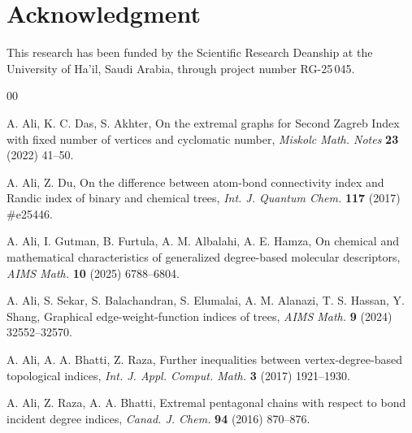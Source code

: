 \documentclass[12pt,a4paper]{article}
\begin{document}
\section*{Acknowledgment}

This research has been funded by the Scientific Research Deanship at the University of Ha\!'il, Saudi Arabia, through project number RG-25\,045.

\footnotesize

 \begin{thebibliography}{00}

 A. Ali, K. C. Das, S. Akhter, On the extremal graphs for Second Zagreb Index with fixed number of vertices and cyclomatic number, {\it Miskolc Math. Notes} {\bf23} (2022) 41--50.

 A. Ali, Z. Du, On the difference between atom-bond connectivity index and Randic index of binary and chemical trees, {\it Int. J. Quantum Chem.} {\bf117} (2017) \#e25446.
\

 A. Ali, I. Gutman, B. Furtula, A. M. Albalahi, A. E. Hamza, On chemical and mathematical characteristics of generalized degree-based molecular descriptors, {\it AIMS Math.} {\bf10} (2025) 6788--6804. %

 A. Ali, S. Sekar, S. Balachandran, S. Elumalai, A. M. Alanazi, T. S. Hassan, Y. Shang, Graphical edge-weight-function indices of trees, {\it AIMS Math.} {\bf9} (2024) 32552--32570.






 A. Ali, A. A. Bhatti, Z. Raza, Further inequalities between vertex-degree-based topological indices, {\it Int. J. Appl. Comput. Math.} {\bf3} (2017) 1921--1930.


 A. Ali, Z. Raza, A. A. Bhatti, Extremal pentagonal chains with respect to bond incident degree indices, {\it Canad. J. Chem.} {\bf94} (2016) 870--876.



\end{thebibliography}
\end{document}
